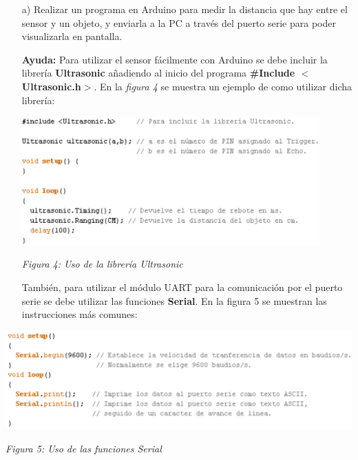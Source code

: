 \documentclass[a4paper,11pt]{article}
\begin{document}
	
\begin{itemize}
	\item[a) ] Realizar un programa en Arduino para medir la distancia que hay entre el sensor y un objeto, y enviarla a la PC a través del puerto serie para poder visualizarla en pantalla.

\textbf{Ayuda:} Para utilizar el sensor fácilmente con Arduino se debe incluir la librería \textbf{Ultrasonic} añadiendo al inicio del programa \textbf{\#Include $<$Ultrasonic.h$>$}. En la \textit{figura 4} se muestra un ejemplo de como utilizar dicha librería:
	\begin{center}
		\includegraphics[width=0.9\textwidth]{fig/fig4.eps}
		\begin{center}	
			\textit{Figura 4: Uso de la librería Ultrasonic}
		\end{center}	
	\end{center}


También, para utilizar el módulo UART para la comunicación por el puerto serie se debe utilizar las funciones  \textbf{Serial}. En la figura 5 se muestran las instrucciones más comunes:
\end{itemize}

	\begin{center}
		\includegraphics[width=1\textwidth]{fig/fig5.eps}
		\begin{center}	
			\textit{Figura 5: Uso de las funciones Serial}
		\end{center}	
	\end{center}
\end{document}
